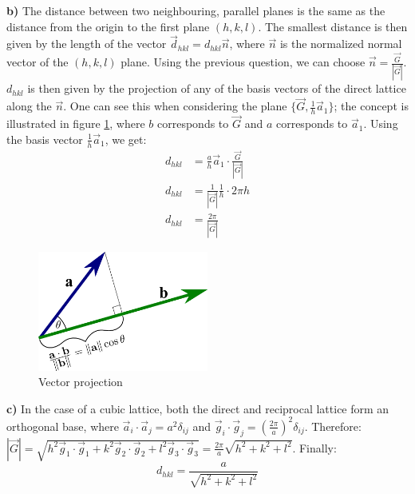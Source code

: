\documentclass[12pt]{article}
\begin{document}
\textbf{b)} The distance between two neighbouring, parallel planes is the same as the distance from the origin to the first plane $(h,k,l)$. The smallest distance is then given by the length of the vector $\Vec{d}_{hkl} = d_{hkl}\Vec{n}$, where $\Vec{n}$ is the normalized normal vector of the $(h,k,l)$ plane. Using the previous question, we can choose $\Vec{n} = \frac{\Vec{G}}{|\Vec{G}|}$. $d_{hkl}$ is then given by the projection of any of the basis vectors of the direct lattice along the $\Vec{n}$. One can see this when considering the plane $\{\Vec{G}, \frac{1}{h}\Vec{a}_1\}$; the concept is illustrated in figure \ref{fig:Projection}, where $b$ corresponds to $\Vec{G}$ and $a$ corresponds to $\Vec{a}_1$. Using the basis vector $\frac{1}{h} \Vec{a}_1$, we get:
\begin{align}
    d_{hkl} &= \frac{a}{h} \Vec{a}_1 \cdot \frac{\Vec{G}}{|\Vec{G}|} \\
    d_{hkl} &= \frac{1}{|\Vec{G}|}\frac{1}{h}\cdot 2\pi h \\
    d_{hkl} &= \frac{2\pi}{|\Vec{G}|}
\end{align}
\begin{figure}[!ht]
    \centering
    \includegraphics[width=0.5\textwidth]{2_XRD/Graphics/Exercises/Projection.png}
    \caption{Vector projection}
    \label{fig:Projection}
\end{figure}
\FloatBarrier

\textbf{c)} In the case of a cubic lattice, both the direct and reciprocal lattice form an orthogonal base, where $\Vec{a}_i \cdot \Vec{a}_j = a^2 \delta_{ij}$ and $\Vec{g}_i \cdot \Vec{g}_j = \left( \frac{2\pi}{a}\right)^2 \delta_{ij}$. Therefore: $|\Vec{G}| = \sqrt{h^2 \Vec{g}_1 \cdot \Vec{g}_1 + k^2 \Vec{g}_2 \cdot \Vec{g}_2 + l^2 \Vec{g}_3 \cdot \Vec{g}_3} = \frac{2\pi}{a} \sqrt{h^2+k^2+l^2}$. Finally:
\begin{equation}
    d_{hkl} = \frac{a}{\sqrt{h^2+k^2+l^2}}
\end{equation}
\end{document}

